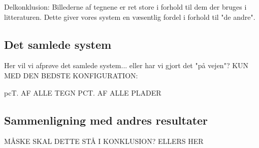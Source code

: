 
Delkonklusion:
Billederne af tegnene er ret store i forhold til dem der bruges i litteraturen. Dette giver vores system en væsentlig fordel i forhold til "de andre".

\subsection{Det samlede system}

Her vil vi afprøve det samlede system... eller har vi gjort det "på vejen"?
KUN MED DEN BEDSTE KONFIGURATION:

pcT. AF ALLE TEGN
PCT. AF ALLE PLADER

\subsection{Sammenligning med andres resultater}

MÅSKE SKAL DETTE STÅ I KONKLUSION? ELLERS HER
